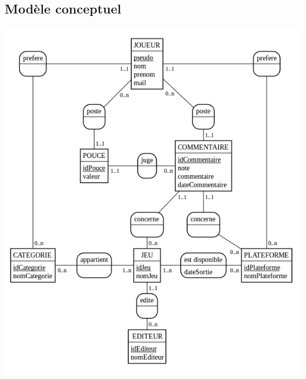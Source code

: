 \documentclass{beamer}
\begin{document}
\subsection{Modèle conceptuel}
\begin{frame}
\begin{center}
\includegraphics[scale=0.30]{modele_conceptuel.png}
\end{center}
\end{frame}
\end{document}
